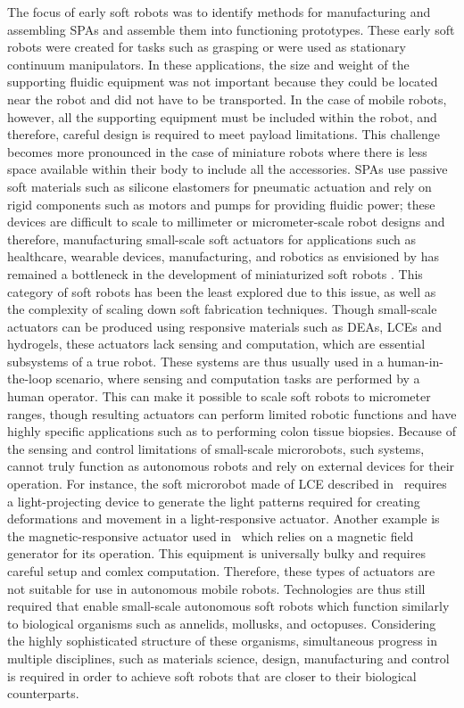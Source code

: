 The focus of early soft robots was to identify methods for manufacturing and assembling SPAs and assemble them into functioning prototypes. These early soft robots were created for tasks such as grasping or were used as stationary continuum manipulators. In these applications, the size and weight of the supporting fluidic equipment was not important because they could be located near the robot and did not have to be transported. In the case of mobile robots, however, all the supporting equipment must be included within the robot, and therefore, careful design is required to meet payload limitations. This challenge becomes more pronounced in the case of miniature robots where there is less space available within their body to include all the accessories. SPAs use passive soft materials such as silicone elastomers for pneumatic actuation and rely on rigid components such as motors and pumps for providing fluidic power; these devices are difficult to scale to millimeter or micrometer-scale robot designs and therefore, manufacturing small-scale soft actuators for applications such as healthcare, wearable devices, manufacturing, and robotics as envisioned by \cite{Hines2017} has remained a bottleneck in the development of miniaturized soft robots \cite{Majidi2019}. This category of soft robots has been the least explored due to this issue, as well as the complexity of scaling down soft fabrication techniques. Though small-scale actuators can be produced using responsive materials such as DEAs, LCEs and hydrogels, these actuators lack sensing and computation, which are essential subsystems of a true robot. These systems are thus usually used in a human-in-the-loop scenario, where sensing and computation tasks are performed by a human operator. This can make it possible to scale soft robots to micrometer ranges, though resulting actuators can perform limited robotic functions and have highly specific applications such as to performing colon tissue biopsies. Because of the sensing and control limitations of small-scale microrobots, such systems, cannot truly function as autonomous robots and rely on external devices for their operation. For instance, the soft microrobot made of LCE described in~\cite{Palagi2016} requires a light-projecting device to generate the light patterns required for creating deformations and movement in a light-responsive actuator. Another example is the magnetic-responsive actuator used in~\cite{Kim2018} which relies on a magnetic field generator for its operation. This equipment is universally bulky and requires careful setup and comlex computation. Therefore, these types of actuators are not suitable for use in autonomous mobile robots. Technologies are thus still required that enable small-scale autonomous soft robots which function similarly to biological organisms such as annelids, mollusks, and octopuses. Considering the highly sophisticated structure of these organisms, simultaneous progress in multiple disciplines, such as materials science, design, manufacturing and control is required in order to achieve soft robots that are closer to their biological counterparts.

